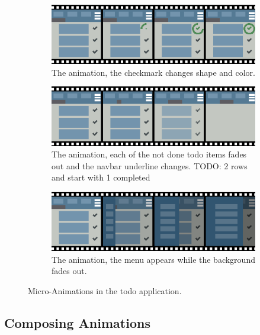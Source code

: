 \begin{figure}[!htbp]
\centering

\begin{subfigure}[h]{\textwidth}
\centering
\includegraphics[width=\figscale\textwidth]{pictures/completeIconCheckFig}
\caption{The  animation, the checkmark changes shape and color.}
\label{fig:completeIconCheck}
\end{subfigure}

\begin{subfigure}[h]{\textwidth}
\centering
\includegraphics[width=\figscale\textwidth]{pictures/onlyDoneFig}
\caption{The  animation, each of the not done todo items fades out and the navbar underline changes. TODO: 2 rows and start with 1 completed}
\label{fig:onlyDoneFig}
\end{subfigure}

\begin{subfigure}[h]{\textwidth}
\centering
\includegraphics[width=\figscale\textwidth]{pictures/menuIntroFig}
\caption{The  animation, the menu appears while the background fades out.}
\label{fig:menuIntroFig}
\end{subfigure}

\caption{Micro-Animations in the todo application.}
\label{fig:animExamples}
\end{figure}

\subsection{Composing Animations}

